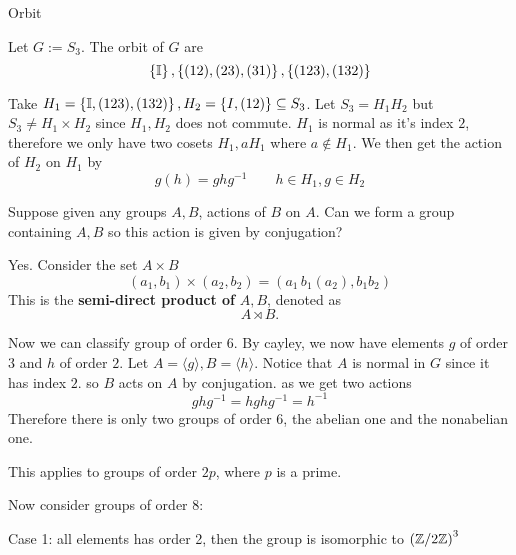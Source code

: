 \begin{definition}
	Orbit
\end{definition}
\begin{example}
	Let $G := S_3$. The orbit of $G$ are
	\[ \left\{ \mathbb I \right\}, \left\{ (12), (23), (31) \right\}, \left\{ (123), (132) \right\}\]
\end{example}
\begin{example}
	Take $H_1 = \left\{ \mathbb I, (123), (132) \right\}, H_2 = \left\{ I, (12) \right\} \subseteq S_3$. Let $S_3 = H_1H_2$ but $S_3 \neq H_1 \times H_2$ since $H_1, H_2$ does not commute. $H_1$ is normal as it's index $2$, therefore we only have two cosets $H_1,aH_1$ where $a \not\in H_1$. We then get the action of $H_2$ on $H_1$ by
	\[ g(h) = ghg^{-1} \qquad h \in H_1, g \in H_2\]
\end{example}
\begin{question}
	Suppose given any groups $A,B$, actions of $B$ on $A$. Can we form a group containing $A,B$ so this action is given by conjugation?
\end{question}
\begin{answer}
	Yes. Consider the set $A \times B$
	\[ (a_1, b_1) \times (a_2, b_2) = (a_1 \, b_1(a_2), b_1b_2)\]
	This is the \textbf{semi-direct product of} $A,B$, denoted as
	\[ A \rtimes B.\]
\end{answer}
Now we can classify group of order $6$. By cayley, we now have elements $g$ of order $3$ and $h$ of order $2$. Let $A = \langle g \rangle, B = \langle h \rangle$. Notice that $A$ is normal in $G$ since it has index $2$. so $B$ acts on $A$ by conjugation. as we get two actions
\[ ghg^{-1} = hghg^{-1} = h^{-1}\]  
Therefore there is only two groups of order $6$, the abelian one and the nonabelian one.
\begin{remark}
	This applies to groups of order $2p$, where $p$ is a prime.
\end{remark}
Now consider groups of order $8$:

Case 1: all elements has order 2, then the group is isomorphic to $\left(\mathbb Z/ 2 \mathbb Z \right)^3$

